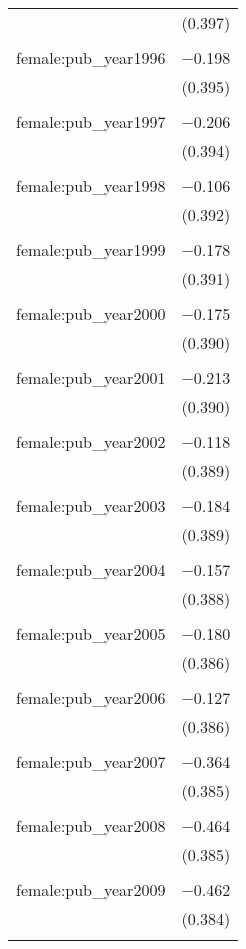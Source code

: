 \begin{table}[!htbp]
\begin{tabular}{@{\extracolsep{5pt}}lc}
  & (0.397) \\ 
  & \\ 
 female:pub\_year1996 & $-$0.198 \\ 
  & (0.395) \\ 
  & \\ 
 female:pub\_year1997 & $-$0.206 \\ 
  & (0.394) \\ 
  & \\ 
 female:pub\_year1998 & $-$0.106 \\ 
  & (0.392) \\ 
  & \\ 
 female:pub\_year1999 & $-$0.178 \\ 
  & (0.391) \\ 
  & \\ 
 female:pub\_year2000 & $-$0.175 \\ 
  & (0.390) \\ 
  & \\ 
 female:pub\_year2001 & $-$0.213 \\ 
  & (0.390) \\ 
  & \\ 
 female:pub\_year2002 & $-$0.118 \\ 
  & (0.389) \\ 
  & \\ 
 female:pub\_year2003 & $-$0.184 \\ 
  & (0.389) \\ 
  & \\ 
 female:pub\_year2004 & $-$0.157 \\ 
  & (0.388) \\ 
  & \\ 
 female:pub\_year2005 & $-$0.180 \\ 
  & (0.386) \\ 
  & \\ 
 female:pub\_year2006 & $-$0.127 \\ 
  & (0.386) \\ 
  & \\ 
 female:pub\_year2007 & $-$0.364 \\ 
  & (0.385) \\ 
  & \\ 
 female:pub\_year2008 & $-$0.464 \\ 
  & (0.385) \\ 
  & \\ 
 female:pub\_year2009 & $-$0.462 \\ 
  & (0.384) \\ 
  & \\ 

\end{tabular}
\end{table}
